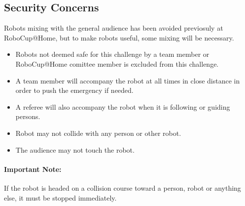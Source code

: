 \subsection{Security Concerns}
Robots mixing with the general audience has been avoided previosuly at RoboCup@Home, but to make robots useful, some mixing will be necessary.

\begin{itemize}
 \item Robots not deemed safe for this challenge by a team member or RoboCup@Home comittee member is excluded from this challenge.
 \item A team member will accompany the robot at all times in close distance in order to push the emergency if needed. 
 \item A referee will also accompany the robot when it is following or guiding persons. 
 \item Robot may not collide with any person or other robot. 
 \item The audience may not touch the robot. 
\end{itemize}

\paragraph*{Important Note:} If the robot is headed on a collision course toward a person, robot or anything else, it must be stopped immediately. 

